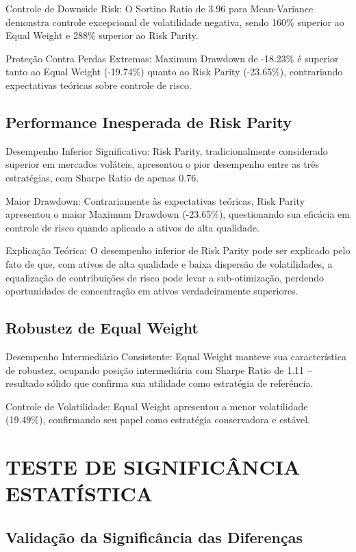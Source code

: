 Controle de Downside Risk: O Sortino Ratio de 3.96 para Mean-Variance demonstra controle excepcional de volatilidade negativa, sendo 160\% superior ao Equal Weight e 288\% superior ao Risk Parity.

Proteção Contra Perdas Extremas: Maximum Drawdown de -18.23\% é superior tanto ao Equal Weight (-19.74\%) quanto ao Risk Parity (-23.65\%), contrariando expectativas teóricas sobre controle de risco.

\subsection{Performance Inesperada de Risk Parity}

Desempenho Inferior Significativo: Risk Parity, tradicionalmente considerado superior em mercados voláteis, apresentou o pior desempenho entre as três estratégias, com Sharpe Ratio de apenas 0.76.

Maior Drawdown: Contrariamente às expectativas teóricas, Risk Parity apresentou o maior Maximum Drawdown (-23.65\%), questionando sua eficácia em controle de risco quando aplicado a ativos de alta qualidade.

Explicação Teórica: O desempenho inferior de Risk Parity pode ser explicado pelo fato de que, com ativos de alta qualidade e baixa dispersão de volatilidades, a equalização de contribuições de risco pode levar a sub-otimização, perdendo oportunidades de concentração em ativos verdadeiramente superiores.

\subsection{Robustez de Equal Weight}

Desempenho Intermediário Consistente: Equal Weight manteve sua característica de robustez, ocupando posição intermediária com Sharpe Ratio de 1.11 – resultado sólido que confirma sua utilidade como estratégia de referência.

Controle de Volatilidade: Equal Weight apresentou a menor volatilidade (19.49\%), confirmando seu papel como estratégia conservadora e estável.

\section{TESTE DE SIGNIFICÂNCIA ESTATÍSTICA}

\subsection{Validação da Significância das Diferenças}

